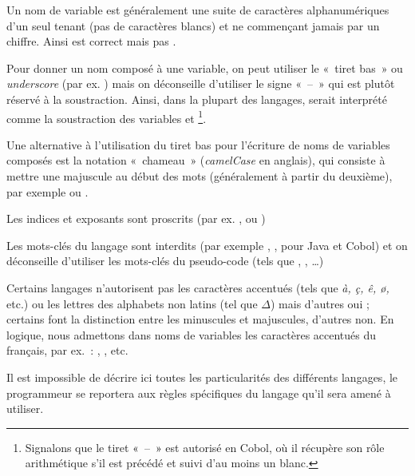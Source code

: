 			\begin{liste}
			\item 
				Un nom de variable est généralement une suite de caractères
				alphanumériques d’un seul tenant (pas de caractères blancs) et ne
				commençant jamais par un chiffre. 
				Ainsi  est correct mais pas . 
			\item 
				Pour donner un nom composé à une variable, 
				on peut utiliser le «~tiret bas~» ou \textit{underscore} 
				(par ex. ) 
				mais on déconseille d’utiliser le signe «~–~» 
				qui est plutôt réservé à la soustraction. 
				Ainsi, dans la plupart des langages,
				 serait interprété comme la
				soustraction des variables  et
				\footnote{%
					Signalons que le tiret \textcolor{black}{«~–~»} 
					est autorisé en Cobol, 
					où il récupère son rôle arithmétique 
					s’il est précédé et suivi d’au moins un blanc.
				}.
			\item 
				Une alternative à l’utilisation du tiret bas 
				pour l’écriture de noms de variables composés 
				est la notation «~chameau~» 
				(\textit{camelCase} en anglais), 
				qui consiste à mettre une majuscule au début des mots
				(généralement à partir du deuxième), 
				par exemple
				 ou
				.
			\item
				Les indices et exposants sont proscrits 
				(par ex.
				,
				 ou
				)
			\item{}
				Les mots-clés du langage sont interdits 
				(par exemple , ,  
				pour Java et Cobol) 
				et on déconseille d’utiliser les mots-clés du pseudo-code 
				(tels que
				, 
				, 
				\dots)
			\item
				Certains langages n’autorisent pas les caractères accentués 
				(tels que \textit{à, ç, ê, ø,} etc.) 
				ou les lettres des alphabets non latins
				(tel que ${\Delta}$) mais d’autres oui ; 
				certains font la distinction
				entre les minuscules et majuscules, d’autres non. 
				En logique, nous admettons dans noms de variables 
				les caractères accentués du français,
				par ex.~: , 
				, etc.
			\end{liste}

			Il est impossible de décrire ici toutes les particularités des
			différents langages, le programmeur se reportera aux règles spécifiques
			du langage qu’il sera amené à utiliser.

